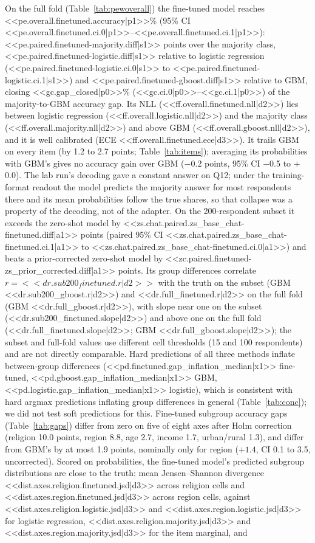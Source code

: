 \documentclass[conference]{IEEEtran}
\begin{document}
On the full fold (Table~\ref{tab:pewoverall}) the fine-tuned model reaches <<pe.overall.finetuned.accuracy|p1>>\% (95\% CI <<pe.overall.finetuned.ci.0|p1>>--<<pe.overall.finetuned.ci.1|p1>>): <<pe.paired.finetuned-majority.diff|s1>> points over the majority class, <<pe.paired.finetuned-logistic.diff|s1>> relative to logistic regression (<<pe.paired.finetuned-logistic.ci.0|s1>> to <<pe.paired.finetuned-logistic.ci.1|s1>>) and <<pe.paired.finetuned-gboost.diff|s1>> relative to GBM, closing <<gc.gap_closed|p0>>\% (<<gc.ci.0|p0>>--<<gc.ci.1|p0>>) of the majority-to-GBM accuracy gap. Its NLL (<<ff.overall.finetuned.nll|d2>>) lies between logistic regression (<<ff.overall.logistic.nll|d2>>) and the majority class (<<ff.overall.majority.nll|d2>>) and above GBM (<<ff.overall.gboost.nll|d2>>), and it is well calibrated (ECE <<ff.overall.finetuned.ece|d3>>). It trails GBM on every item (by 1.2 to 2.7 points; Table~\ref{tab:items}); averaging its probabilities with GBM's gives no accuracy gain over GBM ($-$0.2 points, 95\% CI $-$0.5 to $+$0.0). The lab run's decoding gave a constant answer on Q12; under the training-format readout the model predicts the majority answer for most respondents there and its mean probabilities follow the true shares, so that collapse was a property of the decoding, not of the adapter. On the 200-respondent subset it exceeds the zero-shot model by <<zs.chat.paired.zs_base_chat-finetuned.diff|a1>> points (paired 95\% CI <<zs.chat.paired.zs_base_chat-finetuned.ci.1|a1>> to <<zs.chat.paired.zs_base_chat-finetuned.ci.0|a1>>) and beats a prior-corrected zero-shot model by <<zc.paired.finetuned-zs_prior_corrected.diff|a1>> points. Its group differences correlate $r={<<dr.sub200_finetuned.r|d2>>}$ with the truth on the subset (GBM <<dr.sub200_gboost.r|d2>>) and <<dr.full_finetuned.r|d2>> on the full fold (GBM <<dr.full_gboost.r|d2>>), with slope near one on the subset (<<dr.sub200_finetuned.slope|d2>>) and above one on the full fold (<<dr.full_finetuned.slope|d2>>; GBM <<dr.full_gboost.slope|d2>>); the subset and full-fold values use different cell thresholds (15 and 100 respondents) and are not directly comparable. Hard predictions of all three methods inflate between-group differences (<<pd.finetuned.gap_inflation_median|x1>> fine-tuned, <<pd.gboost.gap_inflation_median|x1>> GBM, <<pd.logistic.gap_inflation_median|x1>> logistic), which is consistent with hard argmax predictions inflating group differences in general (Table~\ref{tab:conc}); we did not test soft predictions for this. Fine-tuned subgroup accuracy gaps (Table~\ref{tab:gaps}) differ from zero on five of eight axes after Holm correction (religion 10.0 points, region 8.8, age 2.7, income 1.7, urban/rural 1.3), and differ from GBM's by at most 1.9 points, nominally only for region ($+1.4$, CI 0.1 to 3.5, uncorrected). Scored on probabilities, the fine-tuned model's predicted subgroup distributions are close to the truth: mean Jensen--Shannon divergence <<dist.axes.religion.finetuned.jsd|d3>> across religion cells and <<dist.axes.region.finetuned.jsd|d3>> across region cells, against <<dist.axes.religion.logistic.jsd|d3>> and <<dist.axes.region.logistic.jsd|d3>> for logistic regression, <<dist.axes.religion.majority.jsd|d3>> and <<dist.axes.region.majority.jsd|d3>> for the item marginal, and 
\end{document}
